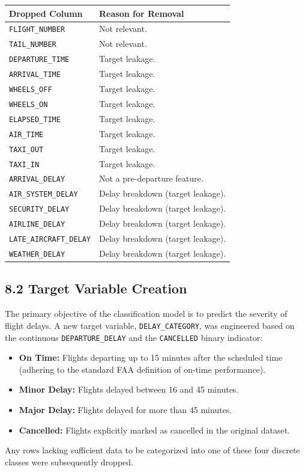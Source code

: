 \documentclass{article}
\newcommand{\code}[1]{\texttt{\small #1}}
\begin{document}
\begin{tcolorbox}[mainbox, title={Dropped Leakage and Identifier Columns}]
\renewcommand{\arraystretch}{1.4}
\begin{tabularx}{\textwidth}{L{5cm} X}
    \toprule
    \textbf{Dropped Column} & \textbf{Reason for Removal} \\
    \midrule
    \code{FLIGHT\_NUMBER} & Not relevant. \\
    \code{TAIL\_NUMBER} & Not relevant. \\
    \code{DEPARTURE\_TIME} & Target leakage. \\
    \code{ARRIVAL\_TIME} & Target leakage. \\
    \code{WHEELS\_OFF} & Target leakage. \\
    \code{WHEELS\_ON} & Target leakage. \\
    \code{ELAPSED\_TIME} & Target leakage. \\
    \code{AIR\_TIME} & Target leakage. \\
    \code{TAXI\_OUT} & Target leakage. \\
    \code{TAXI\_IN} & Target leakage. \\
    \code{ARRIVAL\_DELAY} & Not a pre-departure feature. \\
    \code{AIR\_SYSTEM\_DELAY} & Delay breakdown (target leakage). \\
    \code{SECURITY\_DELAY} & Delay breakdown (target leakage). \\
    \code{AIRLINE\_DELAY} & Delay breakdown (target leakage). \\
    \code{LATE\_AIRCRAFT\_DELAY} & Delay breakdown (target leakage). \\
    \code{WEATHER\_DELAY} & Delay breakdown (target leakage). \\
    \bottomrule
\end{tabularx}
\end{tcolorbox}



\subsection*{\textcolor{accentgold}{8.2 Target Variable Creation}}
The primary objective of the classification model is to predict the severity of flight delays. A new target variable, \texttt{DELAY\_CATEGORY}, was engineered based on the continuous \texttt{DEPARTURE\_DELAY} and the \texttt{CANCELLED} binary indicator:
\begin{itemize}
    \item \textbf{On Time:} Flights departing up to 15 minutes after the scheduled time (adhering to the standard FAA definition of on-time performance).
    \item \textbf{Minor Delay:} Flights delayed between 16 and 45 minutes.
    \item \textbf{Major Delay:} Flights delayed for more than 45 minutes.
    \item \textbf{Cancelled:} Flights explicitly marked as cancelled in the original dataset.
\end{itemize}
Any rows lacking sufficient data to be categorized into one of these four discrete classes were subsequently dropped.
\end{document}
